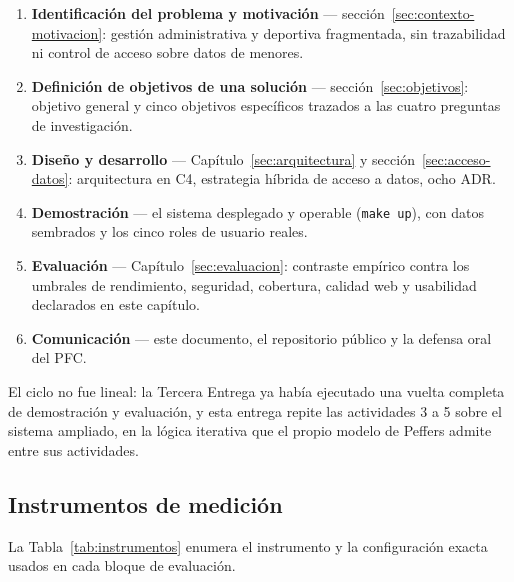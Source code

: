 \documentclass[11pt,a4paper]{article}
\begin{document}
\begin{enumerate}[leftmargin=*]
  \item \textbf{Identificación del problema y motivación} —
    sección~\ref{sec:contexto-motivacion}: gestión administrativa y
    deportiva fragmentada, sin trazabilidad ni control de acceso sobre
    datos de menores.
  \item \textbf{Definición de objetivos de una solución} —
    sección~\ref{sec:objetivos}: objetivo general y cinco objetivos
    específicos trazados a las cuatro preguntas de investigación.
  \item \textbf{Diseño y desarrollo} — Capítulo~\ref{sec:arquitectura} y
    sección~\ref{sec:acceso-datos}: arquitectura en C4, estrategia
    híbrida de acceso a datos, ocho ADR.
  \item \textbf{Demostración} — el sistema desplegado y operable
    (\texttt{make up}), con datos sembrados y los cinco roles de usuario
    reales.
  \item \textbf{Evaluación} — Capítulo~\ref{sec:evaluacion}: contraste
    empírico contra los umbrales de rendimiento, seguridad, cobertura,
    calidad web y usabilidad declarados en este capítulo.
  \item \textbf{Comunicación} — este documento, el repositorio público y
    la defensa oral del PFC.
\end{enumerate}

El ciclo no fue lineal: la Tercera Entrega ya había ejecutado una vuelta
completa de demostración y evaluación, y esta entrega repite las
actividades 3 a 5 sobre el sistema ampliado, en la lógica iterativa que
el propio modelo de Peffers admite entre sus actividades.

\subsection{Instrumentos de medición}
\label{sec:instrumentos}

La Tabla~\ref{tab:instrumentos} enumera el instrumento y la
configuración exacta usados en cada bloque de evaluación.
\end{document}
